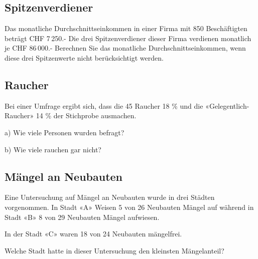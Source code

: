 \newpage
\subsection{Spitzenverdiener}
Das monatliche Durchschnittseinkommen in einer Firma mit 850 Beschäftigten
beträgt CHF 7\,250.- Die drei Spitzenverdiener dieser Firma verdienen
monatlich je CHF 86\,000.-
Berechnen Sie das monatliche Durchschnittseinkommen, wenn diese drei
Spitzenwerte nicht berücksichtigt werden.


\newpage
\subsection{Raucher}
Bei einer Umfrage ergibt sich, dass die 45 Raucher 18 \% und die 
      «Gelegentlich-Raucher» 14 \% der Stichprobe ausmachen.

a) Wie viele Personen wurden befragt?

b) Wie viele rauchen gar nicht?
\newpage
\subsection{Mängel an Neubauten}
Eine Untersuchung auf Mängel an Neubauten wurde in drei Städten
vorgenommen.
In Stadt «A» Weisen 5 von 26 Neubauten Mängel auf während in Stadt «B»
8 von 29 Neubauten Mängel aufwiesen.

In der Stadt «C» waren 18 von 24 Neubauten mängelfrei.

Welche Stadt hatte in dieser Untersuchung den kleinsten Mängelanteil?



